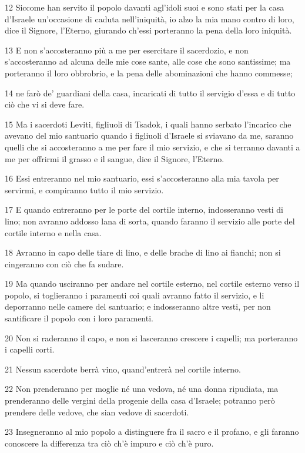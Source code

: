 \par 12 Siccome han servito il popolo davanti agl'idoli suoi e sono stati per la casa d'Israele un'occasione di caduta nell'iniquità, io alzo la mia mano contro di loro, dice il Signore, l'Eterno, giurando ch'essi porteranno la pena della loro iniquità.
\par 13 E non s'accosteranno più a me per esercitare il sacerdozio, e non s'accosteranno ad alcuna delle mie cose sante, alle cose che sono santissime; ma porteranno il loro obbrobrio, e la pena delle abominazioni che hanno commesse;
\par 14 ne farò de' guardiani della casa, incaricati di tutto il servigio d'essa e di tutto ciò che vi si deve fare.
\par 15 Ma i sacerdoti Leviti, figliuoli di Tsadok, i quali hanno serbato l'incarico che avevano del mio santuario quando i figliuoli d'Israele si sviavano da me, saranno quelli che si accosteranno a me per fare il mio servizio, e che si terranno davanti a me per offrirmi il grasso e il sangue, dice il Signore, l'Eterno.
\par 16 Essi entreranno nel mio santuario, essi s'accosteranno alla mia tavola per servirmi, e compiranno tutto il mio servizio.
\par 17 E quando entreranno per le porte del cortile interno, indosseranno vesti di lino; non avranno addosso lana di sorta, quando faranno il servizio alle porte del cortile interno e nella casa.
\par 18 Avranno in capo delle tiare di lino, e delle brache di lino ai fianchi; non si cingeranno con ciò che fa sudare.
\par 19 Ma quando usciranno per andare nel cortile esterno, nel cortile esterno verso il popolo, si toglieranno i paramenti coi quali avranno fatto il servizio, e li deporranno nelle camere del santuario; e indosseranno altre vesti, per non santificare il popolo con i loro paramenti.
\par 20 Non si raderanno il capo, e non si lasceranno crescere i capelli; ma porteranno i capelli corti.
\par 21 Nessun sacerdote berrà vino, quand'entrerà nel cortile interno.
\par 22 Non prenderanno per moglie né una vedova, né una donna ripudiata, ma prenderanno delle vergini della progenie della casa d'Israele; potranno però prendere delle vedove, che sian vedove di sacerdoti.
\par 23 Insegneranno al mio popolo a distinguere fra il sacro e il profano, e gli faranno conoscere la differenza tra ciò ch'è impuro e ciò ch'è puro.
